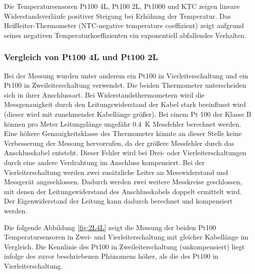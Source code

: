 Die Temperatursensoren Pt100 4L, Pt100 2L, Pt1000 und KTC zeigen lineare Widerstandsverläufe positiver Steigung bei Erhöhung der Temperatur. Das Heißleiter-Thermometer (NTC-negative temperature coeffizient) zeigt aufgrund seines negativen Temperaturkoeffizienten ein exponentiell abfallendes Verhalten. 

\subsubsection{Vergleich von Pt100 4L und Pt100 2L}

Bei der Messung wurden unter anderem ein Pt100 in Vierleiterschaltung und ein Pt100 in Zweileiterschaltung verwendet. Die beiden Thermometer unterscheiden sich in ihrer Anschlussart. Bei Widerstandsthermometern wird die Messgenauigkeit durch den Leitungswiderstand der Kabel stark beeinflusst wird (dieser wird mit zunehmender Kabellänge größer). Bei einem Pt 100 der Klasse B können pro Meter Leitungslänge ungefähr \SI{0,4}{\kelvin} Messfehler berechnet werden. Eine höhere Genauigkeitsklasse des Thermometer könnte an dieser Stelle keine Verbesserung der Messung hervorrufen, da der größere Messfehler durch das Anschlusskabel entsteht. 
Dieser Fehler wird bei Drei- oder Vierleiterschaltungen durch eine andere Verdrahtung im Anschluss kompensiert. Bei der Vierleiterschaltung werden zwei zusätzliche Leiter an Messwiderstand und Messgerät angeschlossen. Dadurch werden zwei weitere Messkreise geschlossen, mit denen der Leitungswiderstand des Anschlusskabels doppelt ermittelt wird. Der Eigenwiderstand der Leitung kann dadurch berechnet und kompensiert werden.

Die folgende Abbildung \ref{fig:2L4L} zeigt die Messung der beiden Pt100 Temperatursensoren in Zwei- und Vierleiterschaltung mit gleicher Kabellänge im Vergleich. Die Kennlinie des Pt100 in Zweileiterschaltung (unkompensiert) liegt infolge des zuvor beschriebenen Phänomens höher, als die des Pt100 in Vierleiterschaltung. 

